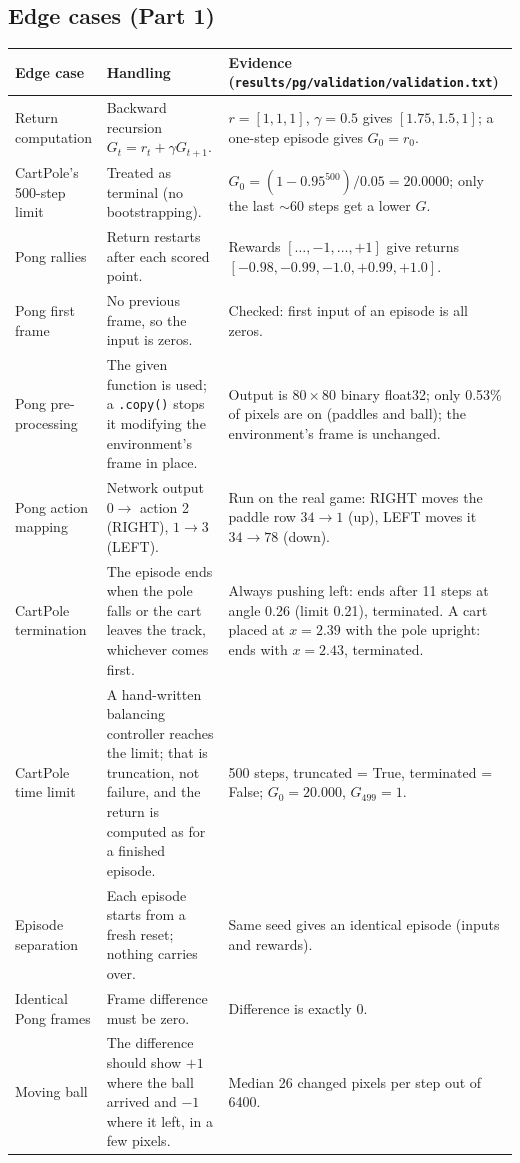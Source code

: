 \documentclass[10pt,a4paper]{article}
\newcommand{\code}[1]{\texttt{#1}}
\newcommand{\hd}[1]{\cellcolor{head}\textbf{#1}}
\begin{document}
\subsection{Edge cases (Part 1)}
\begin{longtable}{@{}p{3.4cm}p{6.3cm}p{6.9cm}@{}}
\hline
\hd{Edge case} & \hd{Handling} & \hd{Evidence (\code{results/pg/validation/validation.txt})} \\
\hline\endhead
Return computation & Backward recursion $G_t=r_t+\gamma G_{t+1}$. & $r=[1,1,1]$, $\gamma=0.5$ gives $[1.75,1.5,1]$; a one-step episode gives $G_0=r_0$. \\
CartPole's 500-step limit & Treated as terminal (no bootstrapping). & $G_0=(1-0.95^{500})/0.05=20.0000$; only the last $\sim$60 steps get a lower $G$. \\
Pong rallies & Return restarts after each scored point. & Rewards $[\dots,-1,\dots,+1]$ give returns $[-0.98,-0.99,-1.0,+0.99,+1.0]$. \\
Pong first frame & No previous frame, so the input is zeros. & Checked: first input of an episode is all zeros. \\
Pong pre-processing & The given function is used; a \code{.copy()} stops it modifying the environment's frame in place. & Output is $80\times80$ binary float32; only 0.53\% of pixels are on (paddles and ball); the environment's frame is unchanged. \\
Pong action mapping & Network output $0\to$ action 2 (RIGHT), $1\to3$ (LEFT). & Run on the real game: RIGHT moves the paddle row $34\to1$ (up), LEFT moves it $34\to78$ (down). \\
CartPole termination & The episode ends when the pole falls or the cart leaves the track, whichever comes first. & Always pushing left: ends after 11 steps at angle 0.26 (limit 0.21), terminated. A cart placed at $x=2.39$ with the pole upright: ends with $x=2.43$, terminated. \\
CartPole time limit & A hand-written balancing controller reaches the limit; that is truncation, not failure, and the return is computed as for a finished episode. & 500 steps, truncated = True, terminated = False; $G_0=20.000$, $G_{499}=1$. \\
Episode separation & Each episode starts from a fresh reset; nothing carries over. & Same seed gives an identical episode (inputs and rewards). \\
Identical Pong frames & Frame difference must be zero. & Difference is exactly 0. \\
Moving ball & The difference should show $+1$ where the ball arrived and $-1$ where it left, in a few pixels. & Median 26 changed pixels per step out of 6400. \\

\end{longtable}
\end{document}
